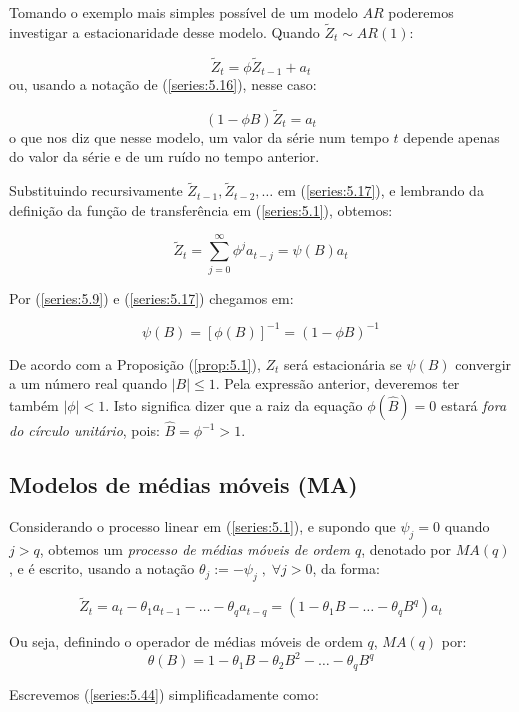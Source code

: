 Tomando o exemplo mais simples possível de um modelo $AR$ poderemos investigar a estacionaridade desse modelo. Quando $\tilde{Z}_t \sim AR(1)$:

\begin{equation}\label{series:5.17}
\tilde{Z}_t = \phi \tilde{Z}_{t-1} + a_t 
\end{equation}
ou, usando a notação de (\ref{series:5.16}), nesse caso:

\[
(1 - \phi B)\tilde{Z}_t = a_t
\]
o que nos diz que nesse modelo, um valor da série num tempo $t$ depende apenas do valor da série e de um ruído no tempo anterior.

Substituindo recursivamente $\tilde{Z}_{t-1}, \tilde{Z}_{t-2}, \ldots$ em (\ref{series:5.17}), e lembrando da definição da função de transferência em (\ref{series:5.1}), obtemos:

\[
\tilde{Z}_t = \sum_{j=0}^\infty \phi^j a_{t-j} = \psi(B)a_t
\]

Por (\ref{series:5.9}) e (\ref{series:5.17}) chegamos em:

\[
\psi(B) = [\phi(B)]^{-1} = (1 - \phi B)^{-1}
\]

De acordo com a Proposição (\ref{prop:5.1}), $Z_t$ será estacionária se $\psi(B)$ convergir a um número real quando $|B| \leq 1$. Pela expressão anterior, deveremos ter também $|\phi| < 1$. Isto significa dizer que a raiz da equação $\phi(\hat{B}) = 0$ estará \emph{fora do círculo unitário}, pois: $\hat{B} = \phi^{-1} > 1$.


\subsection{Modelos de médias móveis (MA)}

Considerando o processo linear em (\ref{series:5.1}), e supondo que $\psi_j = 0$ quando $j > q$, obtemos um \emph{processo de médias móveis de ordem $q$}, denotado por $MA(q)$, e é escrito, usando a notação $\theta_j := -\psi_j\;, \; \forall j>0$, da forma:

\begin{equation}\label{series:5.44}
\tilde{Z}_t = a_t - \theta_1 a_{t-1} - \ldots - \theta_q a_{t-q} = (1 - \theta_1 B - \ldots - \theta_q B^q)a_t 
\end{equation}

Ou seja, definindo o operador de médias móveis de ordem $q$, $MA(q)$ por:
\[
\theta(B) = 1 - \theta_1 B - \theta_2 B^2 - \ldots - \theta_q B^q
\]

Escrevemos (\ref{series:5.44}) simplificadamente como:

